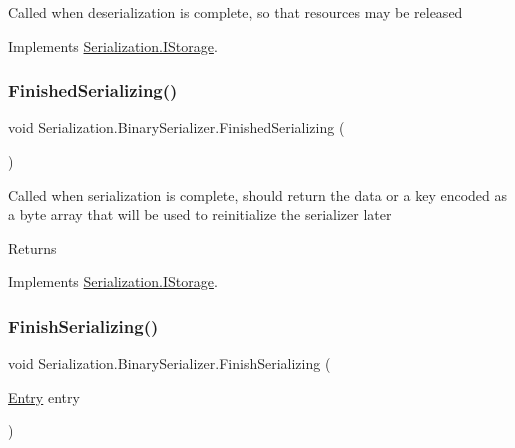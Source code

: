 Called when deserialization is complete, so that resources may be released 



Implements \hyperlink{interface_serialization_1_1_i_storage_affc5c4e5bc5efaf0f1840943358b6bc9}{Serialization.\+I\+Storage}.

\mbox{\label{class_serialization_1_1_binary_serializer_a33f7f74fffe31b07a96ab08fa545e990}} 
\subsubsection{\texorpdfstring{Finished\+Serializing()}{FinishedSerializing()}}
{\footnotesize\ttfamily void Serialization.\+Binary\+Serializer.\+Finished\+Serializing (\begin{DoxyParamCaption}{ }\end{DoxyParamCaption})\hspace{0.3cm}{\ttfamily [inline]}}



Called when serialization is complete, should return the data or a key encoded as a byte array that will be used to reinitialize the serializer later 

\begin{DoxyReturn}{Returns}

\end{DoxyReturn}


Implements \hyperlink{interface_serialization_1_1_i_storage_a5a9811117c5fba81ff98854cfa2c48e1}{Serialization.\+I\+Storage}.

\mbox{\label{class_serialization_1_1_binary_serializer_a026959038d36c07fc77d6da1345ab4d2}} 
\subsubsection{\texorpdfstring{Finish\+Serializing()}{FinishSerializing()}}
{\footnotesize\ttfamily void Serialization.\+Binary\+Serializer.\+Finish\+Serializing (\begin{DoxyParamCaption}\item[{\hyperlink{class_serialization_1_1_entry}{Entry}}]{entry }\end{DoxyParamCaption})\hspace{0.3cm}{\ttfamily [inline]}}



